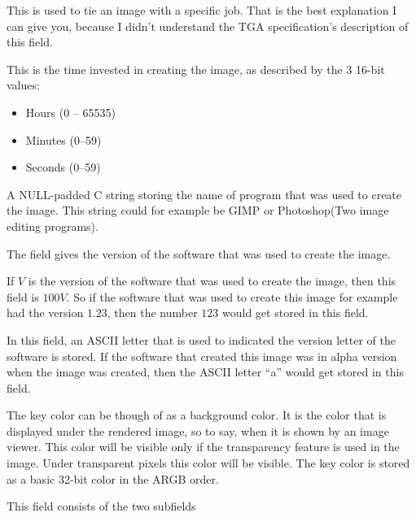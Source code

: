 
This is used to tie an image with a specific job. That is the best
explanation I can give you, because I didn't understand the TGA
specification's description of this field.


This is the time invested in creating the image, as described by the 3
16-bit values:

\begin{itemize}
\item Hours (0 -- 65535)
\item Minutes (0--59)
\item Seconds (0--59)
\end{itemize}


A NULL-padded C string storing the name of program that was used to
create the image. This string could for example be GIMP or
Photoshop(Two image editing programs).


The field gives the version of the software that was used to create
the image.


If $V$ is the version of the software that was used to create the
image, then this field is $100V$. So if the software that was
used to create this image for example had the version $1.23$, then the
number $123$ would get stored in this field.


In this field, an ASCII letter that is used to indicated the version
letter of the software is stored. If the software that created this
image was in alpha version when the image was created, then the ASCII
letter ``a'' would get stored in this field.


The key color can be though of as a background color. It is the color
that is displayed under the rendered image, so to say, when it is
shown by an image viewer. This color will be visible only if the
transparency feature is used in the image. Under transparent pixels
this color will be visible. The key color is stored as a basic 32-bit
color in the ARGB order.


This field consists of the two subfields

